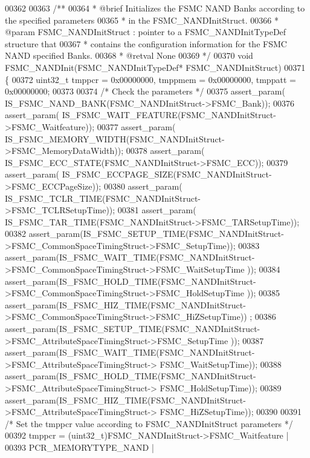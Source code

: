 \begin{DoxyCode}
00362 
00363 \textcolor{comment}{/**}
00364 \textcolor{comment}{  * @brief  Initializes the FSMC NAND Banks according to the specified parameters}
00365 \textcolor{comment}{  *         in the FSMC\_NANDInitStruct.}
00366 \textcolor{comment}{  * @param  FSMC\_NANDInitStruct : pointer to a FSMC\_NANDInitTypeDef structure that}
00367 \textcolor{comment}{  *         contains the configuration information for the FSMC NAND specified Banks.                 
            }
00368 \textcolor{comment}{  * @retval None}
00369 \textcolor{comment}{  */}
00370 \textcolor{keywordtype}{void} FSMC_NANDInit(FSMC\_NANDInitTypeDef* FSMC\_NANDInitStruct)
00371 \{
00372   uint32\_t tmppcr = 0x00000000, tmppmem = 0x00000000, tmppatt = 0x00000000;
00373 
00374   \textcolor{comment}{/* Check the parameters */}
00375   assert_param( IS\_FSMC\_NAND\_BANK(FSMC\_NANDInitStruct->FSMC\_Bank));
00376   assert_param( IS\_FSMC\_WAIT\_FEATURE(FSMC\_NANDInitStruct->FSMC\_Waitfeature));
00377   assert_param( IS\_FSMC\_MEMORY\_WIDTH(FSMC\_NANDInitStruct->FSMC\_MemoryDataWidth));
00378   assert_param( IS\_FSMC\_ECC\_STATE(FSMC\_NANDInitStruct->FSMC\_ECC));
00379   assert_param( IS\_FSMC\_ECCPAGE\_SIZE(FSMC\_NANDInitStruct->FSMC\_ECCPageSize));
00380   assert_param( IS\_FSMC\_TCLR\_TIME(FSMC\_NANDInitStruct->FSMC\_TCLRSetupTime));
00381   assert_param( IS\_FSMC\_TAR\_TIME(FSMC\_NANDInitStruct->FSMC\_TARSetupTime));
00382   assert_param(IS\_FSMC\_SETUP\_TIME(FSMC\_NANDInitStruct->FSMC\_CommonSpaceTimingStruct->FSMC\_SetupTime));
00383   assert_param(IS\_FSMC\_WAIT\_TIME(FSMC\_NANDInitStruct->FSMC\_CommonSpaceTimingStruct->FSMC\_WaitSetupTime
      ));
00384   assert_param(IS\_FSMC\_HOLD\_TIME(FSMC\_NANDInitStruct->FSMC\_CommonSpaceTimingStruct->FSMC\_HoldSetupTime
      ));
00385   assert_param(IS\_FSMC\_HIZ\_TIME(FSMC\_NANDInitStruct->FSMC\_CommonSpaceTimingStruct->FSMC\_HiZSetupTime))
      ;
00386   assert_param(IS\_FSMC\_SETUP\_TIME(FSMC\_NANDInitStruct->FSMC\_AttributeSpaceTimingStruct->FSMC\_SetupTime
      ));
00387   assert_param(IS\_FSMC\_WAIT\_TIME(FSMC\_NANDInitStruct->FSMC\_AttributeSpaceTimingStruct->
      FSMC\_WaitSetupTime));
00388   assert_param(IS\_FSMC\_HOLD\_TIME(FSMC\_NANDInitStruct->FSMC\_AttributeSpaceTimingStruct->
      FSMC\_HoldSetupTime));
00389   assert_param(IS\_FSMC\_HIZ\_TIME(FSMC\_NANDInitStruct->FSMC\_AttributeSpaceTimingStruct->
      FSMC\_HiZSetupTime));
00390 
00391   \textcolor{comment}{/* Set the tmppcr value according to FSMC\_NANDInitStruct parameters */}
00392   tmppcr = (uint32\_t)FSMC\_NANDInitStruct->FSMC_Waitfeature |
00393             PCR_MEMORYTYPE_NAND |

\end{DoxyCode}
